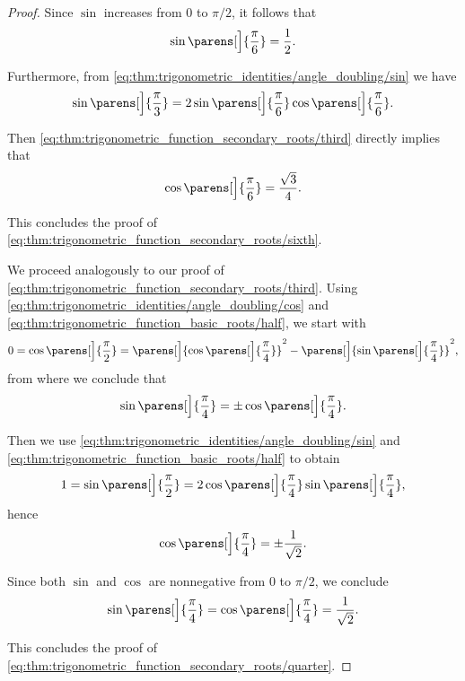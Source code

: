 \begin{proof}
  Since \( \sin \) increases from \( 0 \) to \( \pi / 2 \), it follows that
  \begin{equation*}
    \sin\parens[\Big]{ \frac \pi 6 } = \frac 1 2.
  \end{equation*}

  Furthermore, from \eqref{eq:thm:trigonometric_identities/angle_doubling/sin} we have
  \begin{equation*}
    \sin\parens[\Big]{ \frac \pi 3 } = 2 \sin\parens[\Big]{ \frac \pi 6 } \cos\parens[\Big]{ \frac \pi 6 }.
  \end{equation*}

  Then \eqref{eq:thm:trigonometric_function_secondary_roots/third} directly implies that
  \begin{equation*}
    \cos\parens[\Big]{ \frac \pi 6 } = \frac {\sqrt 3} 4.
  \end{equation*}

  This concludes the proof of \eqref{eq:thm:trigonometric_function_secondary_roots/sixth}.

   We proceed analogously to our proof of \eqref{eq:thm:trigonometric_function_secondary_roots/third}. Using \eqref{eq:thm:trigonometric_identities/angle_doubling/cos} and \eqref{eq:thm:trigonometric_function_basic_roots/half}, we start with
  \begin{equation*}
    0 = \cos\parens[\Big]{ \frac \pi 2 } = \parens[\Big]{ \cos\parens[\Big]{ \frac \pi 4 } }^2 - \parens[\Big]{ \sin\parens[\Big]{ \frac \pi 4 } }^2,
  \end{equation*}
  from where we conclude that
  \begin{equation*}
    \sin\parens[\Big]{ \frac \pi 4 } = \pm \cos\parens[\Big]{ \frac \pi 4 }.
  \end{equation*}

  Then we use \eqref{eq:thm:trigonometric_identities/angle_doubling/sin} and \eqref{eq:thm:trigonometric_function_basic_roots/half} to obtain
  \begin{equation*}
    1 = \sin\parens[\Big]{ \frac \pi 2 } = 2 \cos\parens[\Big]{ \frac \pi 4 } \sin\parens[\Big]{ \frac \pi 4 },
  \end{equation*}
  hence
  \begin{equation*}
    \cos\parens[\Big]{ \frac \pi 4 } = \pm \frac 1 {\sqrt 2}.
  \end{equation*}

  Since both \( \sin \) and \( \cos \) are nonnegative from \( 0 \) to \( \pi / 2 \), we conclude
  \begin{equation*}
    \sin\parens[\Big]{ \frac \pi 4 } = \cos\parens[\Big]{ \frac \pi 4 } = \frac 1 {\sqrt 2}.
  \end{equation*}

  This concludes the proof of \eqref{eq:thm:trigonometric_function_secondary_roots/quarter}.
\end{proof}

